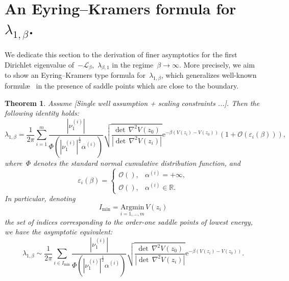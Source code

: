 \documentclass[10pt]{article}
\newcommand{\cL}{\mathcal{L}}
\newcommand{\e}{\mathrm{e}}
\newcommand{\R}{\mathbb{R}}
\newcommand{\1}{\mathbbm 1}
\newcommand{\epsLimit}[1]{\alpha^{(#1)}} %
\newcommand{\hessEigval}[2]{\nu^{(#1)}_{#2}} %
\renewcommand{\O}{\mathcal{O}}
\newtheorem{theorem}{Theorem}
\begin{document}
    \section{An Eyring--Kramers formula for~$\lambda_{1,\beta}$.}
    \label{sec:ek}
    We dedicate this section to the derivation of finer asymptotics for the first Dirichlet eigenvalue of~$-\cL_\beta$,~$\lambda_{\beta,1}$ in the regime~$\beta\to\infty$. More precisely, we aim to show an Eyring--Kramers type formula for~$\lambda_{1,\beta}$, which generalizes well-known formul\ae~\cite{} in the presence of saddle points which are close to the boundary.
    \begin{theorem}
        \label{thm:eyring_kramers}
        Assume [Single well assumption + scaling constraints ...].
        Then the following identity holds:
        \begin{equation}
            \label{eq:eyring_kramers}
            \lambda_{1,\beta} = \frac1{2\pi}\sum_{i=1}^m \frac{|\hessEigval{i}{1}|}{\Phi\left(|\hessEigval{i}{1}|^{\frac12}\epsLimit{i}\right)}\sqrt{\frac{\det\,\nabla^2 V(z_0)}{\left|\det\,\nabla^2 V(z_i)\right|}}\e^{-\beta\left(V(z_i)-V(z_0)\right)}\left(1+\O(\varepsilon_i(\beta))\right),
        \end{equation}
        where~$\Phi$ denotes the standard normal cumulative distribution function, and
        \begin{equation}
            \label{eq:eyring_kramers_error}
            \varepsilon_i(\beta) = \begin{cases}
                \O(), & \epsLimit{i} = +\infty,\\
                \O(), & \epsLimit{i} \in \R.
            \end{cases}
        \end{equation}
        In particular, denoting
        \begin{equation}
            I_{\min} = \underset{i=1,\dots,m}{\mathrm{Argmin}}\,V(z_i)
        \end{equation}
        the set of indices corresponding to the order-one saddle points of lowest energy, we have the asymptotic equivalent:
        \begin{equation}
            \label{eq:eyring_kramers_asympt}
            \lambda_{1,\beta} \sim \frac1{2\pi}\sum_{i\in I_{\min}} \frac{|\hessEigval{i}{1}|}{\Phi\left(|\hessEigval{i}{1}|^{\frac12}\epsLimit{i}\right)}\sqrt{\frac{\det\,\nabla^2 V(z_0)}{\left|\det\,\nabla^2 V(z_i)\right|}}\e^{-\beta\left(V(z_i)-V(z_0)\right)}.
        \end{equation}
    \end{theorem}
\end{document}
